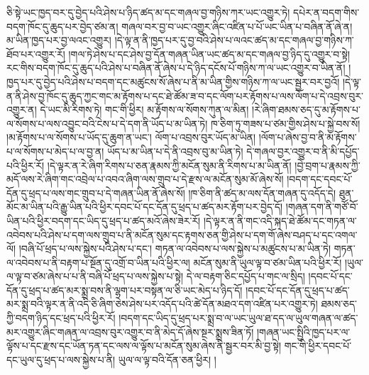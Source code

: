 ཅི་སྟེ་ཡང་ཁྱད་བར་དུ་བྱེད་པའི་ཤེས་པ་ཉིད་ཚད་མ་དང་གཞལ་བྱ་གཉིས་ཀར་ཡང་འགྱུར་ཏེ། དཔེར་ན་བདག་གིས་བདག་ཁོང་དུ་ཆུད་པར་བྱེད་ཙམ་ན། གཞལ་བར་བྱ་བ་ཡང་འགྱུར་ཞིང་འཛིན་པ་པོ་ཡང་ཡིན་པ་བཞིན་ནོ་ཞེ་ན། མ་ཡིན་ཁྱད་པར་བྱ་ལའང་འགྱུར། །དེ་ལྟ་ན་ནི་ཁྱད་པར་དུ་བྱ་བའི་ཤེས་པ་ལའང་ཚད་མ་དང་གཞལ་བྱ་གཉིས་ཀ་ཐོབ་པར་འགྱུར་རོ། །གལ་ཏེ་ཤེས་པ་དང་ཤེས་བྱ་དོན་གཞན་ཡིན་ཡང་ཚད་མ་དང་གཞལ་བྱ་ཉིད་དུ་འགྱུར་བ་སྟེ། རང་གིས་བདག་ཁོང་དུ་ཆུད་པའི་ཤེས་པ་བཞིན་ནོ་ཞེས་པ་དེ་ཉིད་དངོས་པོ་གཉིས་ཀ་ལ་ཡང་འགྱུར་བ་ཡིན་ནོ། །ཁྱད་པར་དུ་བྱེད་པའི་ཤེས་པ་བདག་དང་མཚུངས་སོ་ཞེས་པ་ནི་མ་ཡིན་གྱིས་གཉིས་ཀ་ལ་ཡང་སྦྱར་བར་བྱའོ། །དེ་ལྟ་ན་ནི་ཤེས་བྱ་ཁོང་དུ་ཆུད་ཀྱང་གང་མ་རྟོགས་པ་དང་ཐེ་ཚོམ་ཟ་བ་དང་ལོག་པར་རྟོགས་པ་ལས་ལོག་པ་དེ་འབྲས་བུར་འགྱུར་ན། དེ་ཡང་མི་རིགས་ཏེ། གང་གི་ཕྱིར། མ་རྟོགས་ལ་སོགས་ཀུན་ལ་མིན། །རེ་ཞིག་ཐམས་ཅད་དུ་མ་རྟོགས་པ་ལ་སོགས་པ་ལས་འབྱུང་བའི་ངེས་པ་དེ་དག་ནི་ཡོད་པ་མ་ཡིན་ཏེ། ཁ་ཅིག་ཏུ་གཟས་པ་ཙམ་གྱིས་ཤེས་པ་སྐྱེ་བས་སོ། །མ་རྟོགས་པ་ལ་སོགས་པ་ཡོད་དུ་ཆུག་ན་ཡང་། ལོག་པ་འབྲས་བུར་ཡོད་མ་ཡིན། །ལོག་པ་ཞེས་བྱ་བ་ནི་མ་རྟོགས་པ་ལ་སོགས་པ་མེད་པ་ལ་བྱ་ན། ཡོད་པ་མ་ཡིན་པ་དེ་ནི་འབྲས་བུ་མ་ཡིན་ཏེ། དེ་གཞལ་བྱར་འགྱུར་བ་ནི་མི་དཔྱོད་པའི་ཕྱིར་རོ། །དེ་ལྟར་ན་རེ་ཞིག་རིགས་པ་ཅན་རྣམས་ཀྱི་མངོན་སུམ་ནི་རིགས་པ་མ་ཡིན་ནོ། །བྱེ་བྲག་པ་རྣམས་ཀྱི་མདོ་ལས་རེ་ཞིག་གང་འབྲེལ་པ་འབའ་ཞིག་ལས་གྲུབ་པ་དེ་རྫས་ལ་མངོན་སུམ་མོ་ཞེས་སོ། །བདག་དང་དབང་པོ་དོན་དུ་ཕྲད་པ་ལས་གང་གྲུབ་པ་དེ་གཞན་ཡིན་ནོ་ཞེས་སོ། །ཁ་ཅིག་ནི་ཚད་མ་ལས་དོན་གཞན་དུ་འདོད་དེ། ཐུན་མོང་མ་ཡིན་པའི་རྒྱུ་ཡིན་པའི་ཕྱིར་དབང་པོ་དང་དོན་དུ་ཕྲད་པ་ཚད་མར་རྟོག་པར་བྱེད་དོ། །གཞན་དག་ནི་གཙོ་བོ་ཡིན་པའི་ཕྱིར་བདག་དང་ཡིད་དུ་ཕྲད་པ་ཚད་མའོ་ཞེས་ཟེར་རོ། །དེ་ལྟར་ན་ནི་གང་འདི་སྐད་ཐེ་ཚོམ་དང་གཏན་ལ་འབེབས་པའི་ཤེས་པ་དག་ལས་གྲུབ་པ་ནི་མངོན་སུམ་དང་རྟགས་ཅན་གྱི་ཤེས་པ་དག་གོ་ཞེས་བཤད་པ་དང་འགལ་ལོ། །བཞི་པོ་ཕྲད་པ་ལས་སྐྱེས་པའི་ཤེས་པ་དང་། གཏན་ལ་འབེབས་པ་ལས་སྐྱེས་པ་མཚུངས་པ་མ་ཡིན་ཏེ། གཏན་ལ་འབེབས་པ་ནི་བརྟག་པ་སྔོན་དུ་འགྲོ་བ་ཡིན་པའི་ཕྱིར་ལ། མངོན་སུམ་ནི་ཡུལ་ལྟ་བ་ཙམ་ཡིན་པའི་ཕྱིར་རོ། །ཡུལ་ལ་ལྟ་བ་ཙམ་ཞེས་པ་པ་ནི་བཞི་པོ་ཕྲད་པ་ལས་སྐྱེས་པ་སྟེ། དེ་ལ་བརྟག་ཅིང་དཔྱོད་པ་གང་ལ་སྲིད། །དབང་པོ་དང་དོན་དུ་ཕྲད་པ་ཚད་མར་སྨྲ་བས་ནི་ལྷག་པར་བསྟན་ལ་ཅི་ཡང་མེད་པ་ཉིད་དོ། །དབང་པོ་དང་དོན་དུ་ཕྲད་པ་ཚད་མར་སྨྲ་བའི་ལྟར་ན་ནི་འདི་ཅི་ཞིག་ཅེས་ཤེས་པར་འདོད་པའི་ཚེ་དོན་མཐའ་དག་འཛིན་པར་འགྱུར་ཏེ། ཐམས་ཅད་ཀྱི་བདག་ཉིད་དང་ཕྲད་པའི་ཕྱིར་རོ། །བདག་དང་ཡིད་དུ་ཕྲད་པར་སྨྲ་བ་ལ་ཡང་ཡུལ་ཐ་དད་ལ་ཡུལ་གཞན་ལ་ཚད་མར་འགྱུར་ཞིང་གཞན་ལ་འབྲས་བུར་འགྱུར་བ་ནི་མེད་དོ་ཞེས་སྔར་སྨྲས་ཟིན་ཏོ། །གཞན་ཡང་སྤྱིའི་ཁྱད་པར་ལ་ལྟོས་པ་དང་རྫས་དང་ཡོན་ཏན་དང་ལས་ལ་ལྟོས་པ་མངོན་སུམ་ཞེས་ནི་སྦྱར་བར་མི་བྱ་སྟེ། གང་གི་ཕྱིར་དབང་པོ་དང་ཡུལ་དུ་ཕྲད་པ་ལས་སྐྱེས་པ་ནི། ཡུལ་ལ་ལྟ་བའི་དོན་ཅན་ཕྱིར། །
